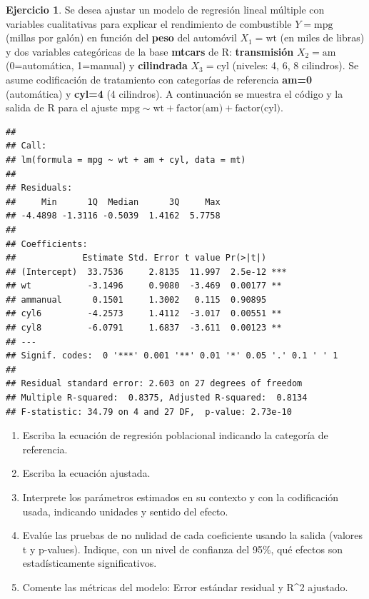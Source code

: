 \documentclass[
  11pt,
]{book}
\theoremstyle{definition}
\theoremstyle{definition}
\theoremstyle{definition}
\newtheorem{exercise}{Ejercicio}[chapter]
\theoremstyle{definition}
\theoremstyle{remark}
\begin{document}
\begin{exercise}

Se desea ajustar un modelo de regresión lineal múltiple con variables cualitativas para explicar el rendimiento de combustible \(Y=\text{mpg}\) (millas por galón) en función del \textbf{peso} del automóvil \(X_1=\text{wt}\) (en miles de libras) y dos variables categóricas de la base \textbf{mtcars} de R: \textbf{transmisión} \(X_2=\text{am}\) (0=automática, 1=manual) y \textbf{cilindrada} \(X_3=\text{cyl}\) (niveles: 4, 6, 8 cilindros). Se asume codificación de tratamiento con categorías de referencia \textbf{am=0} (automática) y \textbf{cyl=4} (4 cilindros). A continuación se muestra el código y la salida de R para el ajuste \(\text{mpg} \sim \text{wt} + \text{factor(am)} + \text{factor(cyl)}\).

\begin{verbatim}
## 
## Call:
## lm(formula = mpg ~ wt + am + cyl, data = mt)
## 
## Residuals:
##     Min      1Q  Median      3Q     Max 
## -4.4898 -1.3116 -0.5039  1.4162  5.7758 
## 
## Coefficients:
##             Estimate Std. Error t value Pr(>|t|)    
## (Intercept)  33.7536     2.8135  11.997  2.5e-12 ***
## wt           -3.1496     0.9080  -3.469  0.00177 ** 
## ammanual      0.1501     1.3002   0.115  0.90895    
## cyl6         -4.2573     1.4112  -3.017  0.00551 ** 
## cyl8         -6.0791     1.6837  -3.611  0.00123 ** 
## ---
## Signif. codes:  0 '***' 0.001 '**' 0.01 '*' 0.05 '.' 0.1 ' ' 1
## 
## Residual standard error: 2.603 on 27 degrees of freedom
## Multiple R-squared:  0.8375, Adjusted R-squared:  0.8134 
## F-statistic: 34.79 on 4 and 27 DF,  p-value: 2.73e-10
\end{verbatim}

\begin{enumerate}
\def\labelenumi{\arabic{enumi}.}
\item
  Escriba la ecuación de regresión poblacional indicando la categoría de referencia.
\item
  Escriba la ecuación ajustada.
\item
  Interprete los parámetros estimados en su contexto y con la codificación usada, indicando unidades y sentido del efecto.
\item
  Evalúe las pruebas de no nulidad de cada coeficiente usando la salida (valores t y p-values). Indique, con un nivel de confianza del 95\%, qué efectos son estadísticamente significativos.
\item
  Comente las métricas del modelo: Error estándar residual y R\^{}2 ajustado.
\end{enumerate}

\end{exercise}
\end{document}
